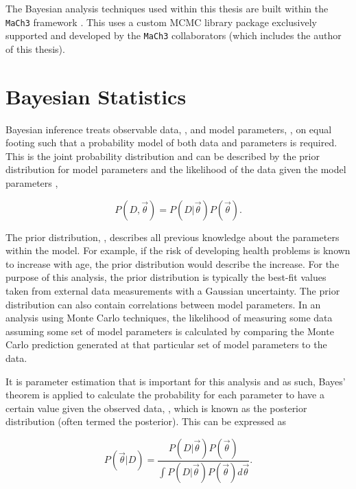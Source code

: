 The Bayesian analysis techniques used within this thesis are built within the \texttt{MaCh3} framework \cite{t2k_tn_140}. This uses a custom MCMC library package exclusively supported and developed by the \texttt{MaCh3} collaborators (which includes the author of this thesis). 

\section{Bayesian Statistics}
\label{sec:MarkovChainMonteCarlo_BayesianStatistics}

Bayesian inference treats observable data, , and model parameters, \quickmath{\vec{\theta}}, on equal footing such that a probability model of both data and parameters is required. This is the joint probability distribution  and can be described by the prior distribution for model parameters  and the likelihood of the data given the model parameters ,

\begin{equation}
  P(D,\vec{\theta}) = P(D|\vec{\theta})P(\vec{\theta}).
\end{equation}

The prior distribution, , describes all previous knowledge about the parameters within the model. For example, if the risk of developing health problems is known to increase with age, the prior distribution would describe the increase. For the purpose of this analysis, the prior distribution is typically the best-fit values taken from external data measurements with a Gaussian uncertainty. The prior distribution can also contain correlations between model parameters. In an analysis using Monte Carlo techniques, the likelihood of measuring some data assuming some set of model parameters is calculated by comparing the Monte Carlo prediction generated at that particular set of model parameters to the data.

It is parameter estimation that is important for this analysis and as such, Bayes' theorem \cite{Bayes:1764vd} is applied to calculate the probability for each parameter to have a certain value given the observed data, , which is known as the posterior distribution (often termed the posterior). This can be expressed as

\begin{equation}
  \label{eq:MarkovChainMonteCarlo_PosteriorDistribution}
  P(\vec{\theta}|D) = \frac{ P(D|\vec{\theta}) P(\vec{\theta}) }{\int P(D|\vec{\theta}) P(\vec{\theta}) d\vec{\theta}}.
\end{equation}


